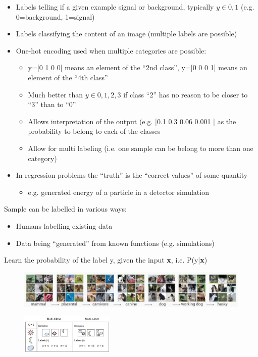 \begin{itemize}
	\item Labels telling if a given example signal or background, typically $y \in{0,1}$ (e.g. 0=background, 1=signal)
	\item Labels classifying the content of an image (multiple labels are possible)
	\item One-hot encoding used when multiple categories are possible:
	\begin{itemize}
		\item y=[0 1 0 0] means an element of the “2nd class”, y=[0 0 0 1] means an element of the “4th class”
		\item Much better than $y\in {0,1,2,3}$ if class “2” has no reason to be closer to “3” than to “0”
		\item Allows interpretation of the output (e.g. [0.1 0.3 0.06 0.001 ] as the probability to belong to each of the classes
		\item Allow for multi labeling (i.e. one sample can be belong to more than one category)
	\end{itemize}
	\item In regression problems the “truth” is the “correct values” of some quantity
	\begin{itemize}
		\item e.g. generated energy of a particle in a detector simulation
	\end{itemize}
\end{itemize}

Sample can be labelled in various ways:
\begin{itemize}
	\item Humans labelling existing data
	\item Data being “generated” from known functions (e.g. simulations)
\end{itemize}

Learn the probability of the label y, given the input \textbf{x}, i.e. P(y|\textbf{x})

\begin{figure}[ht]
	\centering
	\includegraphics[width=1\textwidth]{figure_ml/supervised_learning.png}
\end{figure}
\FloatBarrier

\begin{figure}[ht]
	\centering
	\includegraphics[width=0.4\textwidth]{figure_ml/multi_class.png}
\end{figure}
\FloatBarrier

